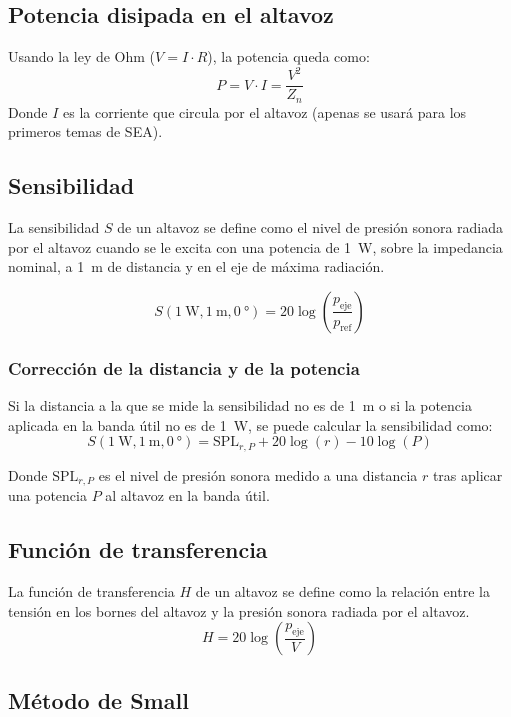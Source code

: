 \documentclass[a4paper, 8pt]{extarticle}
\begin{document}
\begin{multicols}{3}
    \subsection{Potencia disipada en el altavoz}
    Usando la ley de Ohm ($V=I \cdot R$), la potencia queda como:
    \[ P = V \cdot I = \frac{V^2}{Z_n}\]
    \color{gray}
    Donde $I$ es la corriente que circula por el altavoz (apenas se usará para los primeros temas de SEA).
    \color{black}

    \subsection{Sensibilidad}
    La sensibilidad $S$ de un altavoz se define como el nivel de presión sonora radiada por el altavoz cuando se le excita con una potencia de \qty{1}{\watt}, sobre la impedancia nominal, a \qty{1}{\meter} de distancia y en el eje de máxima radiación.

    \[ S \left( \qty{1}{\watt }, \qty{1}{\meter }, \qty{0}{\degree } \right) = 20 \log \left( \frac{p _{\text{eje}}}{p _{\text{ref}}} \right)  \]

    \subsubsection{Corrección de la distancia y de la potencia}
    Si la distancia a la que se mide la sensibilidad no es de \qty{1}{\meter} o si la potencia aplicada en la banda útil no es de \qty{1}{\watt}, se puede calcular la sensibilidad como:
    \[
        S \left( \qty{1}{\watt }, \qty{1}{\meter}, \qty{0}{\degree }  \right) = \text{SPL}_{r,P} + 20 \log \left( r \right) - 10 \log \left( P \right)
    \]

    \color{gray}Donde $\text{SPL}_{r,P}$ es el nivel de presión sonora medido a una distancia $r$ tras aplicar una potencia $P$ al altavoz en la banda útil.\color{black}

    \subsection{Función de transferencia}

    La función de transferencia $H$ de un altavoz se define como la relación entre la tensión en los bornes del altavoz y la presión sonora radiada por el altavoz.
    \[ H = 20 \log \left( \frac{p_{\text{eje}}}{V} \right)  \]

    \subsection{Método de Small}


\end{multicols}
\end{document}
